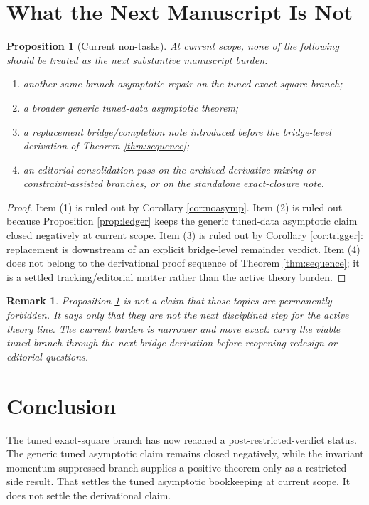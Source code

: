 \documentclass[11pt]{article}
\newtheorem{proposition}{Proposition}
\newtheorem{remark}{Remark}
\begin{document}
\section{What the Next Manuscript Is Not}

\begin{proposition}[Current non-tasks]
\label{prop:nontasks}
At current scope, none of the following should be treated as the next substantive manuscript burden:
\begin{enumerate}
    \item another same-branch asymptotic repair on the tuned exact-square branch;
    \item a broader generic tuned-data asymptotic theorem;
    \item a replacement bridge/completion note introduced before the bridge-level derivation of Theorem \ref{thm:sequence};
    \item an editorial consolidation pass on the archived derivative-mixing or constraint-assisted branches, or on the standalone exact-closure note.
\end{enumerate}
\end{proposition}

\begin{proof}
Item (1) is ruled out by Corollary \ref{cor:noasymp}. Item (2) is ruled out because Proposition \ref{prop:ledger} keeps the generic tuned-data asymptotic claim closed negatively at current scope. Item (3) is ruled out by Corollary \ref{cor:trigger}: replacement is downstream of an explicit bridge-level remainder verdict. Item (4) does not belong to the derivational proof sequence of Theorem \ref{thm:sequence}; it is a settled tracking/editorial matter rather than the active theory burden.
\end{proof}

\begin{remark}
Proposition \ref{prop:nontasks} is not a claim that those topics are permanently forbidden. It says only that they are not the next disciplined step for the active theory line. The current burden is narrower and more exact: carry the viable tuned branch through the next bridge derivation before reopening redesign or editorial questions.
\end{remark}

\section{Conclusion}

The tuned exact-square branch has now reached a post-restricted-verdict status. The generic tuned asymptotic claim remains closed negatively, while the invariant momentum-suppressed branch supplies a positive theorem only as a restricted side result. That settles the tuned asymptotic bookkeeping at current scope. It does not settle the derivational claim.
\end{document}
